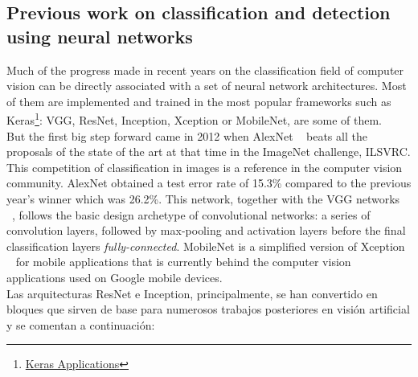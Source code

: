\documentclass{bmvc2k}
\begin{document}
\subsection{Previous work on classification and detection using neural networks}
Much of the progress made in recent years on the classification field of computer vision can be directly associated with a set of neural network architectures. Most of them are implemented and trained in the most popular frameworks such as Keras\footnote {\href{https://keras.io/applications/}{Keras Applications}}: VGG, ResNet, Inception, Xception or MobileNet, are some of them.\\ But the first big step forward came in 2012 when AlexNet ~\cite{krizhevsky2012imagenet} beats all the proposals of the state of the art at that time in the ImageNet challenge, ILSVRC. This competition of classification in images is a reference in the computer vision community. AlexNet obtained a test error rate of 15.3\% compared to the previous year's winner which was 26.2\%. This network, together with the VGG networks ~\cite{simonyan2014very}, follows the basic design archetype of convolutional networks: a series of convolution layers, followed by max-pooling and activation layers before the final classification layers \textit{fully-connected}. MobileNet is a simplified version of Xception ~\cite{chollet2016xception} for mobile applications that is currently behind the computer vision applications used on Google mobile devices.\\
Las arquitecturas ResNet e Inception, principalmente, se han convertido en bloques que sirven de base para numerosos trabajos posteriores en visión artificial y se comentan a continuación: %
\end{document}
